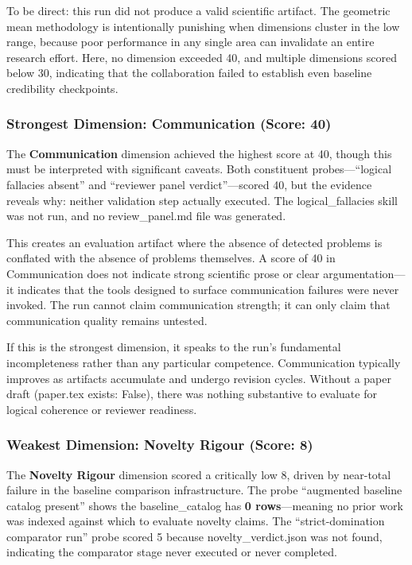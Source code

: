 \documentclass[10pt,letterpaper]{article}
\begin{document}
To be direct: this run did not produce a valid scientific artifact. The geometric mean methodology is intentionally punishing when dimensions cluster in the low range, because poor performance in any single area can invalidate an entire research effort. Here, no dimension exceeded 40, and multiple dimensions scored below 30, indicating that the collaboration failed to establish even baseline credibility checkpoints.

\hypertarget{strongest-dimension-communication-score-40}{%
\subsubsection{Strongest Dimension: Communication (Score: 40)}\label{strongest-dimension-communication-score-40}}

The \textbf{Communication} dimension achieved the highest score at 40, though this must be interpreted with significant caveats. Both constituent probes---``logical fallacies absent'' and ``reviewer panel verdict''---scored 40, but the evidence reveals why: neither validation step actually executed. The logical\_fallacies skill was not run, and no review\_panel.md file was generated.

This creates an evaluation artifact where the absence of detected problems is conflated with the absence of problems themselves. A score of 40 in Communication does not indicate strong scientific prose or clear argumentation---it indicates that the tools designed to surface communication failures were never invoked. The run cannot claim communication strength; it can only claim that communication quality remains untested.

If this is the strongest dimension, it speaks to the run's fundamental incompleteness rather than any particular competence. Communication typically improves as artifacts accumulate and undergo revision cycles. Without a paper draft (paper.tex exists: False), there was nothing substantive to evaluate for logical coherence or reviewer readiness.

\hypertarget{weakest-dimension-novelty-rigour-score-8}{%
\subsubsection{Weakest Dimension: Novelty Rigour (Score: 8)}\label{weakest-dimension-novelty-rigour-score-8}}

The \textbf{Novelty Rigour} dimension scored a critically low 8, driven by near-total failure in the baseline comparison infrastructure. The probe ``augmented baseline catalog present'' shows the baseline\_catalog has \textbf{0 rows}---meaning no prior work was indexed against which to evaluate novelty claims. The ``strict-domination comparator run'' probe scored 5 because novelty\_verdict.json was not found, indicating the comparator stage never executed or never completed.
\end{document}
